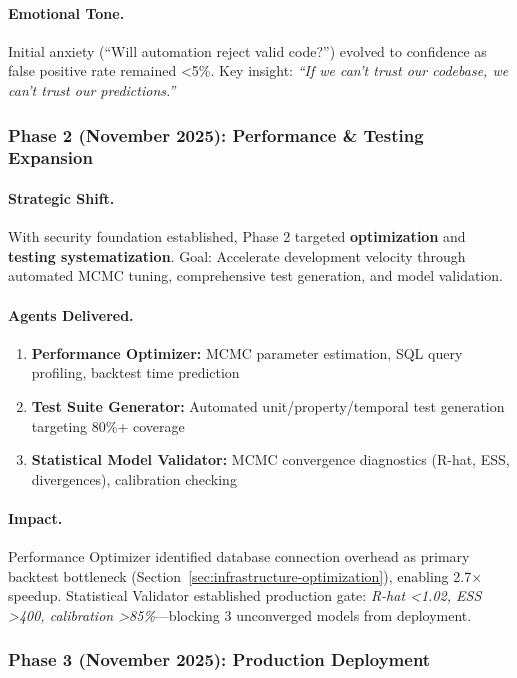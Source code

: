 \paragraph{Emotional Tone.}
Initial anxiety (``Will automation reject valid code?'') evolved to confidence as false positive rate remained <5\%. Key insight: \textit{``If we can't trust our codebase, we can't trust our predictions.''}

\subsubsection{Phase 2 (November 2025): Performance \& Testing Expansion}

\paragraph{Strategic Shift.}
With security foundation established, Phase 2 targeted \textbf{optimization} and \textbf{testing systematization}. Goal: Accelerate development velocity through automated MCMC tuning, comprehensive test generation, and model validation.

\paragraph{Agents Delivered.}
\begin{enumerate}[itemsep=2pt,parsep=0pt]
    \item \textbf{Performance Optimizer:} MCMC parameter estimation, SQL query profiling, backtest time prediction
    \item \textbf{Test Suite Generator:} Automated unit/property/temporal test generation targeting 80\%+ coverage
    \item \textbf{Statistical Model Validator:} MCMC convergence diagnostics (R-hat, ESS, divergences), calibration checking
\end{enumerate}

\paragraph{Impact.}
Performance Optimizer identified database connection overhead as primary backtest bottleneck (Section~\ref{sec:infrastructure-optimization}), enabling 2.7$\times$ speedup. Statistical Validator established production gate: \textit{R-hat <1.02, ESS >400, calibration >85\%}---blocking 3 unconverged models from deployment.

\subsubsection{Phase 3 (November 2025): Production Deployment}

